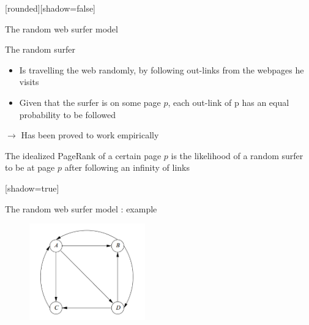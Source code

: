 \documentclass[10pt]{beamer}
\begin{document}
[rounded][shadow=false]
\begin{frame}[allowframebreaks]{The random web surfer model}
  \begin{block}{The random surfer}
    \begin{itemize}
      \item Is travelling the web randomly, by following out-links from the webpages he visits
      \item Given that the surfer is on some page $p$, each out-link of p has an equal probability to be followed
    \end{itemize}
    $\rightarrow$ Has been proved to work empirically
  \end{block}
  \begin{definition}
  The idealized PageRank of a certain page $p$ is the likelihood of a random surfer to be at page $p$ after following an infinity of links

  \end{definition}
\end{frame}

[shadow=true]
\begin{frame}{The random web surfer model : example}
      \begin{figure}
      \centering
        \includegraphics[width = 5cm]{graph1.png}
      \end{figure}
\end{frame}
\end{document}
